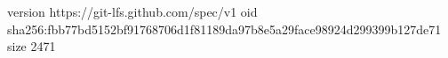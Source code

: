 version https://git-lfs.github.com/spec/v1
oid sha256:fbb77bd5152bf91768706d1f81189da97b8e5a29face98924d299399b127de71
size 2471
